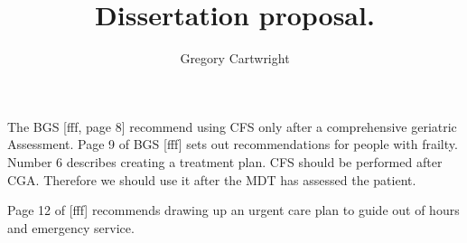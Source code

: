 \documentclass[12pt]{article}
\begin{document}
\author{Gregory Cartwright}
\title{Dissertation proposal.}
\maketitle
The BGS [fff, page 8] recommend using CFS only after a comprehensive geriatric Assessment.
Page 9 of BGS [fff] sets out recommendations for people with frailty.
Number 6 describes creating a treatment plan.
CFS should be performed after CGA. Therefore we should use it after the MDT has assessed the patient.

Page 12 of [fff] recommends drawing up an urgent care plan \endash to guide out of hours and emergency service.
\end{document}
